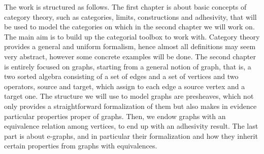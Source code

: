The work is structured as follows.
The first chapter is about basic concepts of category theory, such as categories, limits, constructions and adhesivity, that will be used to model the categories on which in the second chapter we will work on.
The main aim is to build up the categorial toolbox to work with. 
Category theory provides a general and uniform formalism, hence almost all definitions may seem very abstract, however some concrete examples will be done.
The second chapter is entirely focused on graphs, starting from a general notion of graph, that is, a two sorted algebra consisting of a set of edges and a set of vertices and two operators, source and target, which assign to each edge a source vertex and a target one.
The structure we will use to model graphs are presheaves, which not only provides a straightforward formalization of them but also makes in evidence particular properties proper of graphs.
Then, we endow graphs with an equivalence relation among vertices, to end up with an adhesivity result.
The last part is about e-graphs, and in particular their formalization and how they inherit certain properties from graphs with equivalences.


